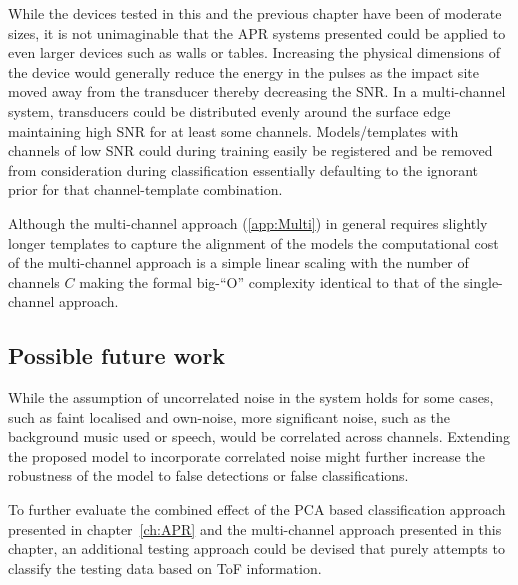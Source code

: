 While the devices tested in this and the previous chapter have been of moderate sizes, it is not unimaginable that the APR systems presented could be applied to even larger devices such as walls or tables. Increasing the physical dimensions of the device would generally reduce the energy in the pulses as the impact site moved away from the transducer thereby decreasing the SNR. In a multi-channel system, transducers could be distributed evenly around the surface edge maintaining high SNR for at least some channels. Models/templates with channels of low SNR could during training easily be registered and be removed from consideration during classification essentially defaulting to the ignorant prior for that channel-template combination.

Although the multi-channel approach (\ref{app:Multi}) in general requires slightly longer templates to capture the alignment of the models the computational cost of the multi-channel approach is a simple linear scaling with the number of channels $C$ making the formal big-``O'' complexity identical to that of the single-channel approach.

\subsection{Possible future work}
While the assumption of uncorrelated noise in the system holds for some cases, such as faint localised and own-noise, more significant noise, such as the background music used or speech, would be correlated across channels. Extending the proposed model to incorporate correlated noise might further increase the robustness of the model to false detections or false classifications.




To further evaluate the combined effect of the PCA based classification approach presented in chapter~\ref{ch:APR} and the multi-channel approach presented in this chapter, an additional testing approach could be devised that purely attempts to classify the testing data based on ToF information.



